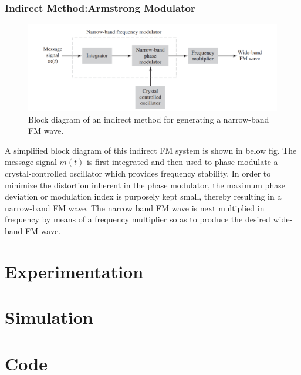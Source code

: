 \documentclass[12pt,a4paper]{article}%
\begin{document}
\begin{flushleft}
	\subsubsection{Indirect Method:Armstrong Modulator}
	\begin{center}
		\begin{figure}[!ht]
			\centering
			\includegraphics[scale=0.4]{./images/BD2.png}
			\caption{Block diagram of an indirect method for generating a narrow-band FM wave.}
			\label{BD2}
		\end{figure}
	\end{center}
	
	
	A simplified block diagram of this indirect FM system is shown in below fig. The message signal $m(t)$ is first integrated and then used to phase-modulate a crystal-controlled oscillator which provides frequency stability. In order to minimize the distortion inherent in the phase modulator, the maximum phase deviation or modulation index is purposely kept small, thereby resulting in a narrow-band FM wave. The narrow band FM wave is next multiplied in frequency by means of a frequency multiplier so as to produce the desired wide-band FM wave.
	\end{flushleft}
	\pagebreak
	\section{Experimentation}
	\pagebreak
	\section{Simulation}
	\pagebreak
	\section{Code}
	\pagebreak
\end{document}

